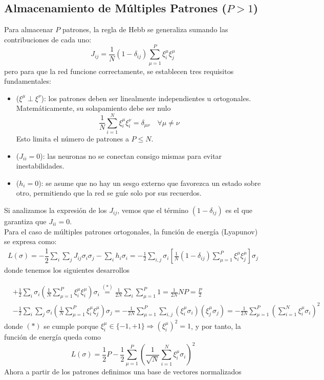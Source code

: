 \subsection{Almacenamiento de Múltiples Patrones ($P > 1$)}
\noindent
Para almacenar $P$ patrones, la regla de Hebb se generaliza sumando las contribuciones de cada uno:
\begin{equation}
    J_{ij} = \frac{1}{N} (1 - \delta_{ij}) \sum_{\mu=1}^{P} \xi_{i}^{\mu} \xi_{j}^{\mu}
\end{equation}
pero para que la red funcione correctamente, se establecen tres requisitos fundamentales:
\begin{itemize}
    \item {} ($\xi^\mu \perp \xi^\nu$): los patrones deben ser linealmente independientes u ortogonales. Matemáticamente, su solapamiento debe ser nulo 
    $$\frac{1}{N} \sum_{i=1}^{N} \xi_i^\mu \xi_i^\nu = \delta_{\mu\nu} \quad \forall \mu\neq \nu$$
    Esto limita el número de patrones a $P \le N$.
    \item {} ($J_{ii} = 0$): las neuronas no se conectan consigo mismas para evitar inestabilidades.
    \item {} ($h_i = 0$): se asume que no hay un sesgo externo que favorezca un estado sobre otro, permitiendo que la red se guíe solo por sus recuerdos.
\end{itemize}
\noindent
Si analizamos la expresión de los $J_{ij}$, vemos que el término $(1 - \delta_{ij})$ es el que garantiza que $J_{ii} = 0$. \\

\noindent
Para el caso de múltiples patrones ortogonales, la función de energía (Lyapunov) se expresa como:
\begin{align*}
    L(\sigma) = -\dfrac{1}{2} \sum_{i} \sum_{j} J_{ij} \sigma_i \sigma_j - \sum_{i} h_i \sigma_i= -\frac{1}{2} \sum_{i,j} \sigma_i \left[ \frac{1}{N} (1 - \delta_{ij}) \sum_{\mu=1}^P \xi_i^\mu \xi_j^\mu \right] \sigma_j
\end{align*}
donde tenemos los siguientes desarrollos

\begin{align*}
    &+\frac{1}{2} \sum_i \sigma_i \left( \frac{1}{N} \sum_{\mu=1}^P \xi_i^\mu \xi_i^\mu \right) \sigma_i\overset{(*)}{=} \frac{1}{2N} \sum_i \sum_{\mu=1}^P 1 = \frac{1}{2N} NP = \frac{P}{2} \\
    &-\frac{1}{2} \sum_i \sum_j \sigma_i \left( \frac{1}{N} \sum_{\mu=1}^P \xi_i^\mu \xi_j^\mu \right) \sigma_j = -\frac{1}{2N} \sum_{\mu=1}^P \sum_{i,j} (\xi_i^\mu \sigma_i) (\xi_j^\mu \sigma_j) = -\frac{1}{2N} \sum_{\mu=1}^P \left( \sum_{i=1}^N \xi_i^\mu \sigma_i \right)^2
\end{align*}
donde $(*)$ se cumple porque $\xi_i^\mu \in \{-1,+1\} \Longrightarrow (\xi_i^\mu)^2 = 1$, y por tanto, la función de energía queda como
\begin{equation*}
    L(\sigma) = \frac{1}{2} P - \frac{1}{2} \sum_{\mu=1}^{P} \left( \frac{1}{\sqrt{N}} \sum_{i=1}^{N} \xi_i^\mu \sigma_i \right)^2
\end{equation*}
Ahora a partir de los patrones definimos una base de vectores normalizados

